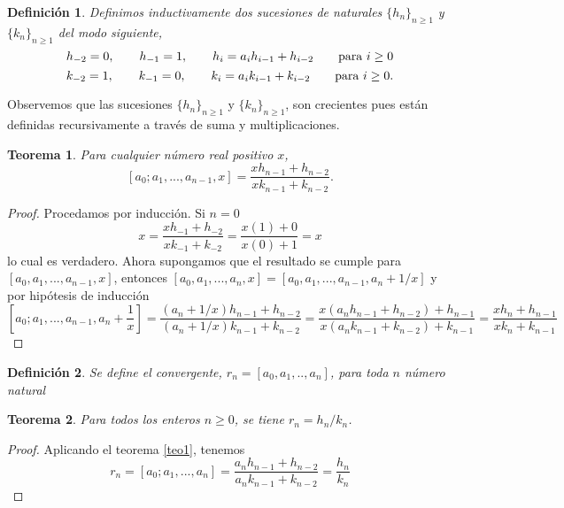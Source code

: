 \documentclass[11pt, article]{article}
\newtheorem{theorem}{Teorema} %
\newtheorem{definition}{Definición}
\begin{document}
    \begin{definition}
     Definimos inductivamente dos sucesiones de naturales $\{h_n\}_{n\geq 1}$ y $\{k_n\}_{n\geq 1}$ del modo siguiente,
        \[
        h_{-2}=0, \qquad h_{-1} =1, \qquad h_i=a_ih_{i-1} + h_{i-2} \qquad \textnormal{para } i\geq 0
        \]
        \[
        k_{-2}=1, \qquad k_{-1} =0, \qquad k_i=a_ik_{i-1} + k_{i-2} \qquad \textnormal{para } i\geq 0.
        \]
        \end{definition}
        Observemos que las sucesiones $\{h_n\}_{n\geq 1}$ y $\{k_n\}_{n\geq 1}$, son crecientes pues están definidas recursivamente a través de suma y multiplicaciones.
        \begin{theorem}
        Para cualquier número real positivo $x$,
        \[
        [a_0;a_1,...,a_{n-1}, x]=\dfrac{xh_{n-1}+h_{n-2}}{xk_{n-1}+k_{n-2}}. \label{teo1}
        \]
        \end{theorem}
    \begin{proof} Procedamos por inducción. Si $n=0$
        \[
        x=\dfrac{xh_{-1}+h_{-2}}{xk_{-1}+k_{-2}}=\dfrac{x(1)+0}{x(0)+1}=x
        \]
        lo cual es verdadero. Ahora supongamos que el resultado se cumple para $[a_0,a_1,...,a_{n-1},x]$, entonces $[a_0,a_1,...,a_n,x]=[a_0,a_1,...,a_{n-1},a_n + 1/x]$ y por hipótesis de inducción
    \[
        \left[a_0;a_1,...,a_{n-1},a_n + \dfrac{1}{x}\right] 
        =  \dfrac{(a_n+1/x)h_{n-1}+h_{n-2}}{(a_n+1/x)k_{n-1}+k_{n-2}} 
        = \dfrac{x(a_nh_{n-1}+h_{n-2})+h_{n-1}}{x(a_nk_{n-1}+k_{n-2})+k_{n-1}} 
        = \dfrac{xh_n+h_{n-1}}{xk_n+k_{n-1}}
    \]
    \end{proof}
    
    
    \begin{definition} Se define el convergente, $r_n=[a_0,a_1,..,a_n]$, para toda $n$ número natural
    \end{definition}
    
    \begin{theorem}
        Para todos los enteros $n \geq 0$, se tiene $r_n=h_n/k_n$.
    \end{theorem} 

    
    \begin{proof}
        Aplicando el teorema \ref{teo1}, tenemos
    \[
    r_n=[a_0;a_1,...,a_n]=\dfrac{a_nh_{n-1}+h_{n-2}}{a_nk_{n-1}+k_{n-2}}=\dfrac{h_n}{k_n}\]
    \end{proof} 
    
\end{document}
